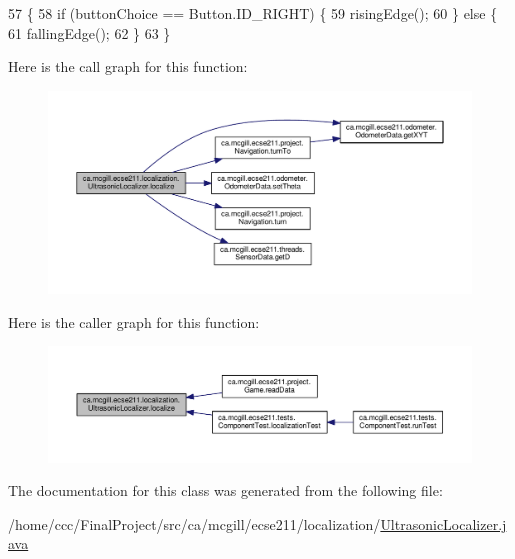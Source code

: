\begin{DoxyCode}
57                                          \{
58     \textcolor{keywordflow}{if} (buttonChoice == Button.ID\_RIGHT) \{
59       risingEdge();
60     \} \textcolor{keywordflow}{else} \{
61       fallingEdge();
62     \}
63   \}
\end{DoxyCode}
Here is the call graph for this function\+:
\nopagebreak
\begin{figure}[H]
\begin{center}
\leavevmode
\includegraphics[width=350pt]{classca_1_1mcgill_1_1ecse211_1_1localization_1_1_ultrasonic_localizer_ab78196997d7409aec0c35603686989ad_cgraph}
\end{center}
\end{figure}
Here is the caller graph for this function\+:
\nopagebreak
\begin{figure}[H]
\begin{center}
\leavevmode
\includegraphics[width=350pt]{classca_1_1mcgill_1_1ecse211_1_1localization_1_1_ultrasonic_localizer_ab78196997d7409aec0c35603686989ad_icgraph}
\end{center}
\end{figure}


The documentation for this class was generated from the following file\+:\begin{DoxyCompactItemize}
\item 
/home/ccc/\+Final\+Project/src/ca/mcgill/ecse211/localization/\hyperlink{_ultrasonic_localizer_8java}{Ultrasonic\+Localizer.\+java}\end{DoxyCompactItemize}
